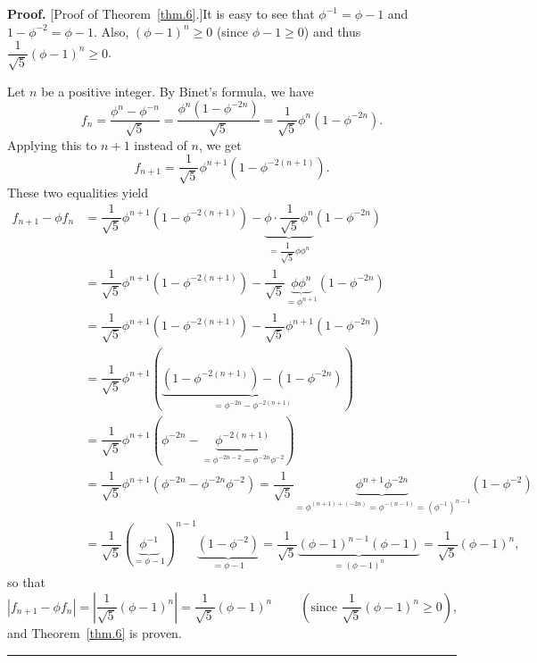 \documentclass[numbers=enddot,12pt,final,onecolumn,notitlepage]{scrartcl}%
\numberwithin{exer}{section}
\theoremstyle{definition}
\newenvironment{proof}[1][Proof]{\noindent\textbf{#1.} }{\ \rule{0.5em}{0.5em}}
\begin{document}
\begin{proof}
[Proof of Theorem~\ref{thm.6}.]It is easy to see that $\phi^{-1}=\phi-1$ and
$1-\phi^{-2}=\phi-1$. Also, $\left(  \phi-1\right)  ^{n} \geq0$ (since $\phi-1
\geq0$) and thus $\dfrac{1}{\sqrt{5}} \left(  \phi-1\right)  ^{n} \geq0$.

Let $n$ be a positive integer. By Binet's formula, we have%
\[
f_{n}=\dfrac{\phi^{n}-\phi^{-n}}{\sqrt{5}}=\dfrac{\phi^{n}\left(  1-\phi
^{-2n}\right)  }{\sqrt{5}}=\dfrac{1}{\sqrt{5}}\phi^{n}\left(  1-\phi
^{-2n}\right)  .
\]
Applying this to $n+1$ instead of $n$, we get%
\[
f_{n+1}=\dfrac{1}{\sqrt{5}}\phi^{n+1}\left(  1-\phi^{-2\left(  n+1\right)
}\right)  .
\]
These two equalities yield%
\begin{align*}
f_{n+1}-\phi f_{n}  &  =\dfrac{1}{\sqrt{5}}\phi^{n+1}\left(  1-\phi^{-2\left(
n+1\right)  }\right)  -\underbrace{\phi\cdot\dfrac{1}{\sqrt{5}}\phi^{n}%
}_{=\dfrac{1}{\sqrt{5}}\phi\phi^{n}}\left(  1-\phi^{-2n}\right) \\
&  =\dfrac{1}{\sqrt{5}}\phi^{n+1}\left(  1-\phi^{-2\left(  n+1\right)
}\right)  -\dfrac{1}{\sqrt{5}}\underbrace{\phi\phi^{n}}_{=\phi^{n+1}}\left(
1-\phi^{-2n}\right) \\
&  =\dfrac{1}{\sqrt{5}}\phi^{n+1}\left(  1-\phi^{-2\left(  n+1\right)
}\right)  -\dfrac{1}{\sqrt{5}}\phi^{n+1}\left(  1-\phi^{-2n}\right) \\
&  =\dfrac{1}{\sqrt{5}}\phi^{n+1}\left(  \underbrace{\left(  1-\phi^{-2\left(
n+1\right)  }\right)  -\left(  1-\phi^{-2n}\right)  }_{=\phi^{-2n}%
-\phi^{-2\left(  n+1\right)  }}\right) \\
&  =\dfrac{1}{\sqrt{5}}\phi^{n+1}\left(  \phi^{-2n}-\underbrace{\phi
^{-2\left(  n+1\right)  }}_{=\phi^{-2n-2}=\phi^{-2n}\phi^{-2}}\right) \\
&  =\dfrac{1}{\sqrt{5}}\phi^{n+1}\left(  \phi^{-2n}-\phi^{-2n}\phi
^{-2}\right)  =\dfrac{1}{\sqrt{5}}\underbrace{\phi^{n+1}\phi^{-2n}}%
_{=\phi^{\left(  n+1\right)  +\left(  -2n\right)  }=\phi^{-\left(  n-1\right)
}=\left(  \phi^{-1}\right)  ^{n-1}}\left(  1-\phi^{-2}\right) \\
&  =\dfrac{1}{\sqrt{5}}\left(  \underbrace{\phi^{-1}}_{=\phi-1}\right)
^{n-1}\underbrace{\left(  1-\phi^{-2}\right)  }_{=\phi-1}=\dfrac{1}{\sqrt{5}%
}\underbrace{\left(  \phi-1\right)  ^{n-1}\left(  \phi-1\right)  }_{=\left(
\phi-1\right)  ^{n}}=\dfrac{1}{\sqrt{5}}\left(  \phi-1\right)  ^{n},
\end{align*}
so that%
\[
\left\vert f_{n+1}-\phi f_{n}\right\vert =\left\vert \dfrac{1}{\sqrt{5}%
}\left(  \phi-1\right)  ^{n}\right\vert =\dfrac{1}{\sqrt{5}}\left(
\phi-1\right)  ^{n}\ \ \ \ \ \ \ \ \ \ \left(  \text{since }\dfrac{1}{\sqrt
{5}}\left(  \phi-1\right)  ^{n}\geq0\right)  ,
\]
and Theorem~\ref{thm.6} is proven.
\end{proof}
\end{document}
